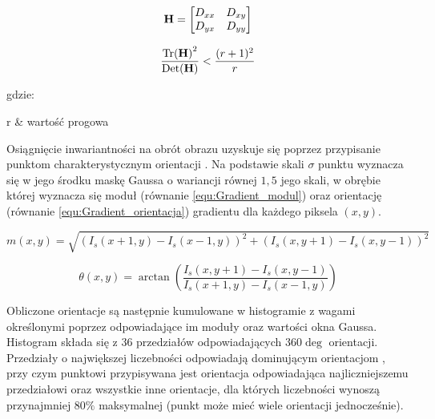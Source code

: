 \begin{equation}
\label{equ:Hesjan}
	\mathbf{H} = \begin{bmatrix}
		D_{xx} & D_{xy} \\
		D_{yx} & D_{yy} \\
	\end{bmatrix}
\end{equation}

\begin{equation}
\label{equ:Hesjan_prog}
	\frac{\mathrm{Tr(}\mathbf{H}\mathrm{)}^2}{\mathrm{Det(}\mathbf{H}\mathrm{)}} < \frac{(r + 1)^2}{r}
\end{equation}

\noindent
gdzie:
\begin{conditions}
	r & wartość progowa \\
\end{conditions}

Osiągnięcie inwariantności na obrót obrazu uzyskuje się poprzez przypisanie punktom charakterystycznym orientacji \cite{Lowe2004}. Na podstawie skali $\sigma$ punktu wyznacza się w jego środku maskę Gaussa o wariancji równej $1,5$ jego skali, w obrębie której wyznacza się moduł (równanie \ref{equ:Gradient_modul}) oraz orientację (równanie \ref{equ:Gradient_orientacja}) gradientu dla każdego piksela $(x, y)$.

\begin{equation}
\label{equ:Gradient_modul}
	m(x,y) = \sqrt{(I_s(x + 1, y) - I_s(x - 1, y))^2 + (I_s(x, y + 1) - I_s(x, y - 1))^2}
\end{equation}

\begin{equation}
\label{equ:Gradient_orientacja}
	\theta(x,y) = \arctan(\frac{I_s(x, y + 1) - I_s(x, y - 1)}{I_s(x + 1, y) - I_s(x - 1, y)})
\end{equation}

Obliczone orientacje są następnie kumulowane w histogramie z wagami określonymi poprzez odpowiadające im moduły oraz wartości okna Gaussa. Histogram składa się z $36$ przedziałów odpowiadających $360 \deg$ orientacji. Przedziały o największej liczebności odpowiadają dominującym orientacjom \cite{Lowe2004}, przy czym punktowi przypisywana jest orientacja odpowiadająca najliczniejszemu przedziałowi oraz wszystkie inne orientacje, dla których liczebności wynoszą przynajmniej $80 \%$ maksymalnej (punkt może mieć wiele orientacji jednocześnie).

